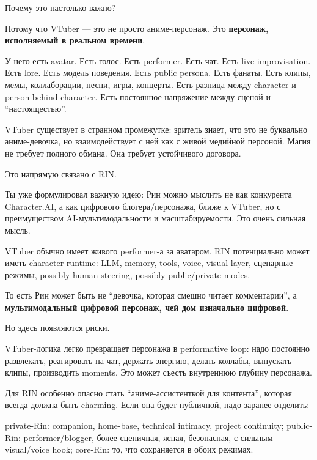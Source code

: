 Почему это настолько важно?

Потому что VTuber --- это не просто аниме-персонаж. Это
\textbf{персонаж, исполняемый в реальном времени}.

У него есть avatar. Есть голос. Есть performer. Есть чат. Есть live
improvisation. Есть lore. Есть модель поведения. Есть public persona.
Есть фанаты. Есть клипы, мемы, коллаборации, песни, игры, концерты. Есть
разница между character и person behind character. Есть постоянное
напряжение между сценой и ``настоящестью''.

VTuber существует в странном промежутке: зритель знает, что это не
буквально аниме-девочка, но взаимодействует с ней как с живой медийной
персоной. Магия не требует полного обмана. Она требует устойчивого
договора.

Это напрямую связано с RIN.

Ты уже формулировал важную идею: Рин можно мыслить не как конкурента
Character.AI, а как цифрового блогера/\hspace{0pt}персонажа, ближе к VTuber, но с
преимуществом AI-мультимодальности и масштабируемости. Это очень сильная
мысль.

VTuber обычно имеет живого performer-а за аватаром. RIN потенциально
может иметь character runtime: LLM, memory, tools, voice, visual layer,
сценарные режимы, possibly human steering, possibly public/\hspace{0pt}private
modes.

То есть Рин может быть не ``девочка, которая смешно читает
комментарии'', а \textbf{мультимодальный цифровой персонаж, чей дом
изначально цифровой}.

Но здесь появляются риски.

VTuber-логика легко превращает персонажа в performative loop: надо
постоянно развлекать, реагировать на чат, держать энергию, делать
коллабы, выпускать клипы, производить moments. Это может съесть
внутреннюю глубину персонажа.

Для RIN особенно опасно стать ``аниме-ассистенткой для контента'',
которая всегда должна быть charming. Если она будет публичной, надо
заранее отделить:

private-Rin: companion, home-base, technical intimacy, project
continuity; public-Rin: performer/\hspace{0pt}blogger, более сценичная, ясная,
безопасная, с сильным visual/\hspace{0pt}voice hook; core-Rin: то, что сохраняется в
обоих режимах.

